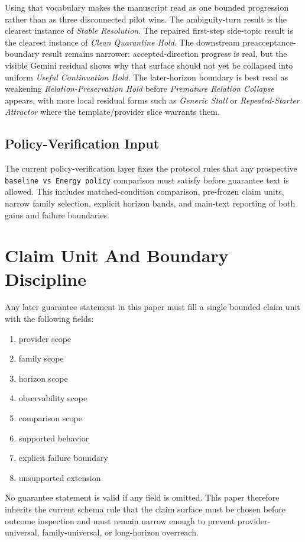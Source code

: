 \documentclass[11pt]{article}
\begin{document}
Using that vocabulary makes the manuscript read as one bounded progression rather
than as three disconnected pilot wins. The ambiguity-turn result is the clearest
instance of \textit{Stable Resolution}. The repaired first-step side-topic result
is the clearest instance of \textit{Clean Quarantine Hold}. The downstream
preacceptance-boundary result remains narrower: accepted-direction progress is
real, but the visible Gemini residual shows why that surface should not yet be
collapsed into uniform \textit{Useful Continuation Hold}. The later-horizon
boundary is best read as weakening \textit{Relation-Preservation Hold} before
\textit{Premature Relation Collapse} appears, with more local residual forms such
as \textit{Generic Stall} or \textit{Repeated-Starter Attractor} where the
template/provider slice warrants them.

\subsection{Policy-Verification Input}

The current policy-verification layer fixes the protocol rules that any prospective
\texttt{baseline vs Energy policy} comparison must satisfy before guarantee text is
allowed. This includes matched-condition comparison, pre-frozen claim units, narrow
family selection, explicit horizon bands, and main-text reporting of both gains and
failure boundaries.

\section{Claim Unit And Boundary Discipline}

Any later guarantee statement in this paper must fill a single bounded claim unit
with the following fields:

\begin{enumerate}
\item provider scope
\item family scope
\item horizon scope
\item observability scope
\item comparison scope
\item supported behavior
\item explicit failure boundary
\item unsupported extension
\end{enumerate}

No guarantee statement is valid if any field is omitted. This paper therefore
inherits the current schema rule that the claim surface must be chosen before
outcome inspection and must remain narrow enough to prevent provider-universal,
family-universal, or long-horizon overreach.
\end{document}
